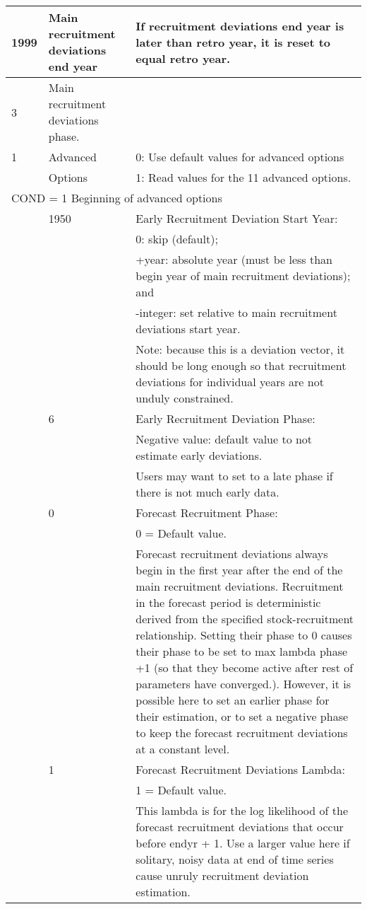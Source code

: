 \begin{longtable}{p{1cm} p{3cm} p{11cm}}
	1999 \Tstrut & Main recruitment deviations end year & If recruitment deviations end year is later than retro year, it is reset to equal retro year.\Bstrut\\
	\hline

	3 \Tstrut & Main recruitment deviations phase. & \Bstrut\\
	\hline

	1 \Tstrut & Advanced  & 0: Use default values for advanced options \\
	  & Options  & 1: Read values for the 11 advanced options.\Bstrut\\
	\hline

	\multicolumn{3}{l}{COND = 1 Beginning of advanced options}\Tstrut\Bstrut\\
	& 1950 & Early Recruitment Deviation Start Year: \\
	&  & 0: skip (default); \\
	&  & +year: absolute year (must be less than begin year of main recruitment deviations); and\\
	&  & -integer: set relative to main recruitment deviations start year.\\
	&  & Note: because this is a deviation vector, it should be long enough so that recruitment deviations for individual years are not unduly constrained. \\

	\Tstrut & 6 & Early Recruitment Deviation Phase: \\
	& & Negative value: default value to not estimate early deviations. \\
	& & Users may want to set to a late phase if there is not much early data.\\
	
	\Tstrut & 0 & Forecast Recruitment Phase: \\
			&   & 0 = Default value. \\
	        &   & Forecast recruitment deviations always begin in the first year after the end of the main recruitment deviations. Recruitment in the forecast period is deterministic derived from the specified stock-recruitment relationship.  Setting their phase to 0 causes their phase to be set to max lambda phase +1 (so that they become active after rest of parameters have converged.).  However, it is possible here to set an earlier phase for their estimation, or to set a negative phase to keep the forecast recruitment deviations at a constant level.\Bstrut\\

	\Tstrut & 1 & Forecast Recruitment Deviations Lambda:\\
			&   & 1 = Default value. \\
			&   & This lambda is for the log likelihood of the forecast recruitment deviations that occur before endyr + 1.  Use a larger value here if solitary, noisy data at end of time series cause unruly recruitment deviation estimation.\\
	

\end{longtable}
